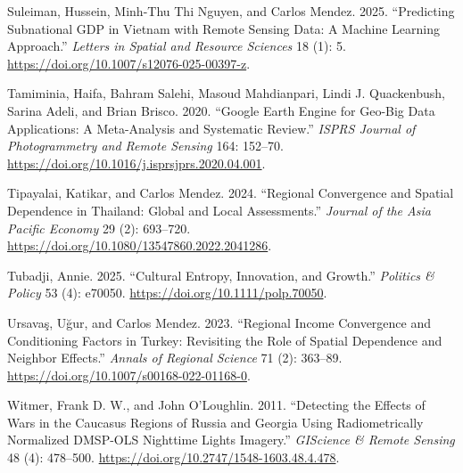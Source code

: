\documentclass[
  letterpaper,
  DIV=11,
  numbers=noendperiod]{scrartcl}
\newlength{\cslhangindent}
\newenvironment{CSLReferences}[2] %
 {\begin{list}{}{%
  \setlength{\itemindent}{0pt}
  \setlength{\leftmargin}{0pt}
  \setlength{\parsep}{0pt}
  \ifodd #1
   \setlength{\leftmargin}{\cslhangindent}
   \setlength{\itemindent}{-1\cslhangindent}
  \fi
  \setlength{\itemsep}{#2\baselineskip}}}
 {\end{list}}
\begin{document}
\begin{CSLReferences}{1}{0}
Suleiman, Hussein, Minh-Thu Thi Nguyen, and Carlos Mendez. 2025.
{``Predicting Subnational {GDP} in {Vietnam} with Remote Sensing Data:
{A} Machine Learning Approach.''} \emph{Letters in Spatial and Resource
Sciences} 18 (1): 5. \url{https://doi.org/10.1007/s12076-025-00397-z}.

Tamiminia, Haifa, Bahram Salehi, Masoud Mahdianpari, Lindi J.
Quackenbush, Sarina Adeli, and Brian Brisco. 2020. {``Google {E}arth
{E}ngine for Geo-Big Data Applications: A Meta-Analysis and Systematic
Review.''} \emph{ISPRS Journal of Photogrammetry and Remote Sensing}
164: 152--70. \url{https://doi.org/10.1016/j.isprsjprs.2020.04.001}.

Tipayalai, Katikar, and Carlos Mendez. 2024. {``Regional Convergence and
Spatial Dependence in {Thailand}: {Global} and Local Assessments.''}
\emph{Journal of the Asia Pacific Economy} 29 (2): 693--720.
\url{https://doi.org/10.1080/13547860.2022.2041286}.

Tubadji, Annie. 2025. {``Cultural Entropy, Innovation, and Growth.''}
\emph{Politics \& Policy} 53 (4): e70050.
\url{https://doi.org/10.1111/polp.70050}.

Ursavaş, Uğur, and Carlos Mendez. 2023. {``Regional Income Convergence
and Conditioning Factors in {Turkey}: {Revisiting} the Role of Spatial
Dependence and Neighbor Effects.''} \emph{Annals of Regional Science} 71
(2): 363--89. \url{https://doi.org/10.1007/s00168-022-01168-0}.

Witmer, Frank D. W., and John O'Loughlin. 2011. {``Detecting the Effects
of Wars in the {Caucasus} Regions of {Russia} and {Georgia} Using
Radiometrically Normalized {DMSP-OLS} Nighttime Lights Imagery.''}
\emph{GIScience \& Remote Sensing} 48 (4): 478--500.
\url{https://doi.org/10.2747/1548-1603.48.4.478}.

\end{CSLReferences}
\end{document}
